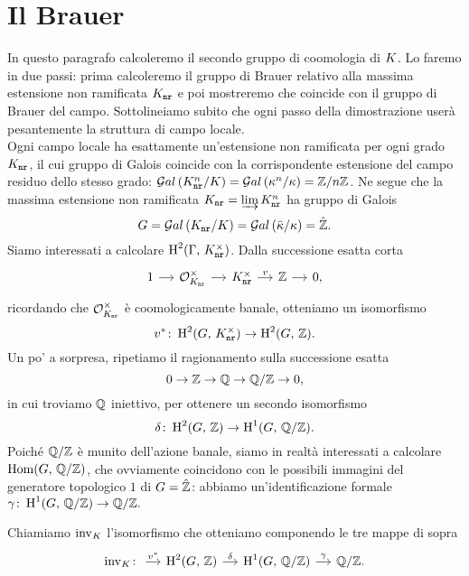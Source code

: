 \section{Il Brauer}
In questo paragrafo calcoleremo il secondo gruppo di coomologia di $ K $. Lo faremo in due passi: prima calcoleremo il gruppo di Brauer relativo alla massima estensione non ramificata $ K_\mathtt{nr} $ e poi mostreremo che coincide con il gruppo di Brauer del campo. Sottolineiamo subito che ogni passo della dimostrazione userà pesantemente la struttura di campo locale.  \\

Ogni campo locale ha esattamente un'estensione non ramificata per ogni grado $ K_\mathtt{nr} $, il cui gruppo di Galois coincide con la corrispondente estensione del campo residuo dello stesso grado: $ \mathcal{G}al\left( K^n_\texttt{nr} / K \right) = \mathcal{G}al\left( \kappa^n / \kappa \right) = \mathbb{Z} / n\mathbb{Z} $. Ne segue che la massima estensione non ramificata $ K_\mathtt{nr} = \varinjlim K^n_\texttt{nr} $ ha gruppo di Galois
\[ G = \mathcal{G}al\left( K_\mathtt{nr} / K \right) = \mathcal{G}al\left( \bar{\kappa} / \kappa \right) = \hat{\mathbb{Z}}. \]
Siamo interessati a calcolare $ \operatorname{H}^2(\Gamma, \, K_\mathtt{nr}^\times) $. Dalla successione esatta corta
\[ \begin{tikzcd}[column sep = small]
1 \rar
& \mathcal{O}_{\knr}^\times \rar
& \knr^\times \rar["v"]
& \Z \rar
& 0,
\end{tikzcd} \]
ricordando che $ \mathcal{O}_{K_\mathtt{nr}}^\times $ è coomologicamente banale, otteniamo un isomorfismo
\[ v^* \colon \operatorname{H}^2(G, \, K_\mathtt{nr}^\times) \to \operatorname{H}^2(G, \, \mathbb{Z}). \]
Un po' a sorpresa, ripetiamo il ragionamento sulla successione esatta
\[ 0 \to \mathbb{Z} \to \mathbb{Q} \to \mathbb{Q}/\mathbb{Z} \to 0, \]
in cui troviamo $ \mathbb{Q} $ iniettivo, per ottenere un secondo isomorfismo
\[ \delta \colon \operatorname{H}^2(G, \, \mathbb{Z}) \to \operatorname{H}^1(G, \, \mathbb{Q}/\mathbb{Z}). \]
Poiché $ \mathbb{Q}/\mathbb{Z} $ è munito dell'azione banale, siamo in realtà interessati a calcolare $ \operatorname{Hom}(G, \, \mathbb{Q}/\mathbb{Z}) $, che ovviamente coincidono con le possibili immagini del generatore topologico $ 1 $ di $ G = \hat{\mathbb{Z}} $: abbiamo un'identificazione formale $ \gamma \colon \operatorname{H}^1(G, \, \mathbb{Q}/\mathbb{Z}) \to \mathbb{Q}/\mathbb{Z}.  $

\begin{definition}
	Chiamiamo $ \operatorname{inv}_K $ l'isomorfismo che otteniamo componendo le tre mappe di sopra
	\[ \begin{tikzcd}[column sep = small]
	\inv_\K \colon  \rar["v^*"]
	& \HH^2(G, \, \Z) \rar["\delta"]
	& \HH^1(G, \, \Q/\Z) \rar["\gamma"]
	& \Q/\Z.
	\end{tikzcd} \]
\end{definition}

